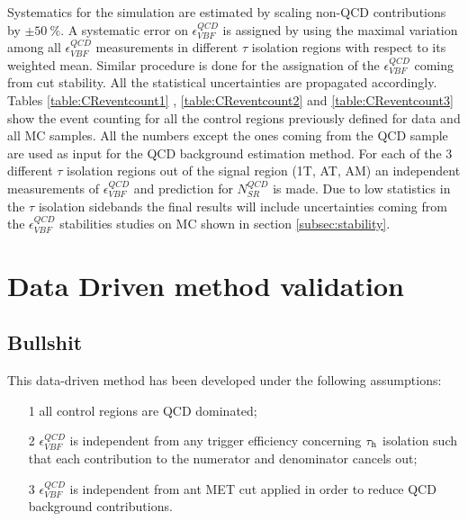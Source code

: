 Systematics for the simulation are estimated by scaling non-QCD contributions by $\pm50~\%$. A systematic error on $\epsilon^{QCD}_{VBF}$ is assigned by using the maximal variation among all $\epsilon^{QCD}_{VBF}$ measurements in different $\tau$ isolation regions with respect to its weighted mean. Similar procedure is done for the assignation of the $\epsilon^{QCD}_{VBF}$ coming from \met cut stability. All the statistical uncertainties are propagated accordingly. Tables \ref{table:CReventcount1} , \ref{table:CReventcount2} and \ref{table:CReventcount3} show the event counting for all the control regions previously defined for data and all MC samples. All the numbers except the ones coming from the QCD sample are used as input for the QCD background estimation method. For each of the 3 different $\tau$ isolation regions out of the signal region (1T, AT, AM) an independent measurements of $\epsilon^{QCD}_{VBF}$  and prediction for $N^{QCD}_{SR}$ is made. Due to low statistics in the $\tau$ isolation sidebands the final results will include uncertainties coming from the $\epsilon^{QCD}_{VBF}$ stabilities studies on MC shown in section \ref{subsec:stability}.



\section{Data Driven method validation}
\label{QCD_bg_pred_validation}

\subsection{Bullshit}


This data-driven method has been developed under the following assumptions:

\begin{itemize}
	\item[1] all control regions are QCD dominated;
	\item[2] $\epsilon^{QCD}_{VBF}$ is independent from any trigger efficiency concerning $\tau_{\text{h}}$ isolation such that each contribution to the numerator and denominator cancels out;
	\item[3] $\epsilon^{QCD}_{VBF}$ is independent from ant MET cut applied in order to reduce QCD background contributions. 
\end{itemize}




